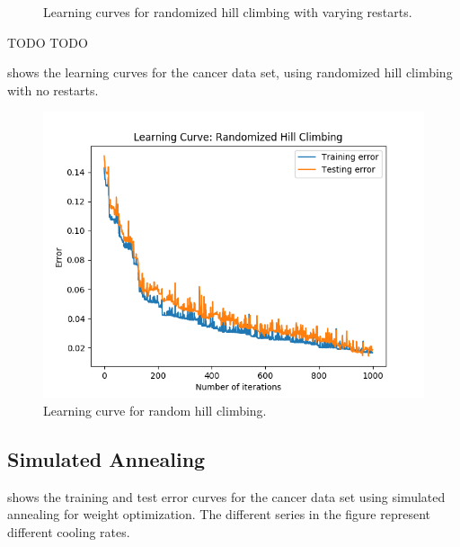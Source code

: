 \documentclass{article}
\begin{document}
\begin{figure}[htb]
  \caption{Learning curves for randomized hill climbing with varying restarts.}
  \label{fig:rhc-params}
  \end{figure}

  TODO TODO

   shows the learning curves for the cancer data set, using randomized hill climbing with no restarts.

  \begin{figure}[htb]
  \centering
  \includegraphics[width=.5\linewidth]{out/plot/RHC.png}
  \caption{Learning curve for random hill climbing.}
  \label{fig:rhc-learning}
  \end{figure}

  \subsection{Simulated Annealing}

   shows the training and test error curves for the cancer data set using simulated annealing for weight optimization. The different series in the figure represent different cooling rates.
\end{document}
